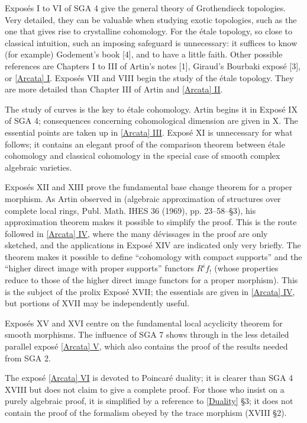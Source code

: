 Exposés I to VI of SGA 4 give the general theory of Grothendieck topologies.
Very detailed, they can be valuable when studying exotic topologies, such as
the one that gives rise to crystalline cohomology. For the étale topology,
so close to classical intuition, such an imposing safeguard is unnecessary:
it suffices to know (for example) Godement's book [4], and to have a little
faith. Other possible references are Chapters I to III of Artin's notes [1],
Giraud's Bourbaki exposé [3], or \hyperref[I:1]{[Arcata] I}. Exposés VII and
VIII begin the study of the étale topology. They are more detailed than
Chapter III of Artin and \hyperref[I:2]{[Arcata] II}.

The study of curves is the key to étale cohomology. Artin begins it in
Exposé IX of SGA 4; consequences concerning cohomological dimension are
given in X. The essential points are taken up in \hyperref[I:3]{[Arcata] III}.
Exposé XI is unnecessary for what follows; it contains an elegant proof of
the comparison theorem between étale cohomology and classical cohomology
in the special case of smooth complex algebraic varieties.

Exposés XII and XIII prove the fundamental base change theorem for a proper
morphism. As Artin observed in (algebraic approximation of structures over
complete local rings, Publ. Math. IHES 36 (1969), pp. 23--58--§3), his
approximation theorem makes it possible to simplify the proof. This is the
route followed in \hyperref[I:4]{[Arcata] IV}, where the many dévissages in
the proof are only sketched, and the applications in Exposé XIV are indicated
only very briefly. The theorem makes it possible to define ``cohomology with
compact supports'' and the ``higher direct image with proper supports''
functors $R^i f_!$ (whose properties reduce to those of the higher direct image
functors for a proper morphism). This is the subject of the prolix Exposé XVII;
the essentials are given in \hyperref[I:4]{[Arcata] IV}, but portions of XVII
may be independently useful.

Exposés XV and XVI centre on the fundamental local acyclicity theorem for
smooth morphisms. The influence of SGA 7 shows through in the less detailed
parallel exposé \hyperref[I:5]{[Arcata] V}, which also contains the proof of
the results needed from SGA 2.

The exposé \hyperref[I:6]{[Arcata] VI} is devoted to Poincaré duality; it is
clearer than SGA 4 XVIII but does not claim to give a complete proof. For those
who insist on a purely algebraic proof, it is simplified by a reference to
\hyperref[V]{[Duality]} §3; it does not contain the proof of the formalism
obeyed by the trace morphism (XVIII §2).


